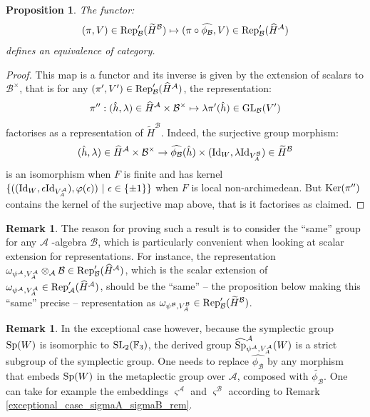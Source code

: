 \documentclass[11pt]{article}
\theoremstyle{plain}
\newtheorem{prop}[theo]{Proposition}
\theoremstyle{definition}
\newtheorem{rem}[theo]{Remark}
\theoremstyle{plain}
\theoremstyle{definition}
\theoremstyle{plain}
\begin{document}
\begin{prop} The functor:
$$(\pi,V) \in \textup{Rep}_\mathcal{B}'(\widetilde{H}^\mathcal{B})  \mapsto (\pi \circ \widehat{\phi_\mathcal{B}},V) \in \textup{Rep}_\mathcal{B}'(\widehat{H}^\mathcal{A})$$
defines an equivalence of category. \end{prop}

\begin{proof} This map is a functor and its inverse is given by the extension of scalars to $\mathcal{B}^\times$, that is for any $(\pi',V') \in \textup{Rep}_\mathcal{B}'(\widehat{H}^\mathcal{A})$, the representation:
$$\pi'' : (\hat{h},\lambda) \in \widehat{H}^\mathcal{A} \times \mathcal{B}^\times \mapsto \lambda \pi'(\hat{h}) \in \textup{GL}_\mathcal{B}(V')$$
factorises as a representation of $\widetilde{H}^\mathcal{B}$. Indeed, the surjective group morphism:
$$(\hat{h},\lambda) \in \widehat{H}^\mathcal{A} \times \mathcal{B}^\times \to \widehat{\phi_\mathcal{B}}(\hat{h}) \times (\textup{Id}_W,\lambda \textup{Id}_{V_A^\mathcal{B}}) \in \widetilde{H}^\mathcal{B}$$
is an isomorphism when $F$ is finite and has kernel $\{ ((\textup{Id}_W,\epsilon \textup{Id}_{V_A^\mathcal{A}}),\varphi(\epsilon)) \ | \ \epsilon \in \{ \pm 1 \} \}$ when $F$ is local non-archimedean. But $\textup{Ker}(\pi'')$ contains the kernel of the surjective map above, that is it factorises as claimed. \end{proof}

\begin{rem} \label{exceptional_case_weil_rep_rem} The reason for proving such a result is to consider the ``same'' group for any $\mathcal{A}$ -algebra $\mathcal{B}$, which is particularly convenient when looking at scalar extension for representations. For instance, the representation $\omega_{\psi^\mathcal{A},V_A^\mathcal{A}} \otimes_\mathcal{A} \mathcal{B} \in \textup{Rep}_\mathcal{B}'(\widehat{H}^\mathcal{A})$, which is the scalar extension of $\omega_{\psi^\mathcal{A},V_A^\mathcal{A}} \in \textup{Rep}_\mathcal{A}'(\widehat{H}^\mathcal{A})$, should be the ``same'' -- the proposition below making this ``same'' precise -- representation as 
$\omega_{\psi^\mathcal{B},V_A^\mathcal{B}} \in  \textup{Rep}_\mathcal{B}'(\widetilde{H}^\mathcal{B})$. \end{rem}

\begin{rem} In the exceptional case however, because the symplectic group $\textup{Sp}(W)$ is isomorphic to $\textup{SL}_2(\mathbb{F}_3)$, the derived group $\widehat{\textup{Sp}}_{\psi^\mathcal{A},V_A^\mathcal{A}}^\mathcal{A}(W)$ is a strict subgroup of the symplectic group. One needs to replace $\widehat{\phi_\mathcal{B}}$ by any morphism that embeds $\textup{Sp}(W)$ in the metaplectic group over $\mathcal{A}$, composed with $\widetilde{\phi_\mathcal{B}}$. One can take for example the embeddings $\varsigma^\mathcal{A}$ and $\varsigma^\mathcal{B}$ according to Remark \ref{exceptional_case_sigmaA_sigmaB_rem}. \end{rem}
\end{document}
